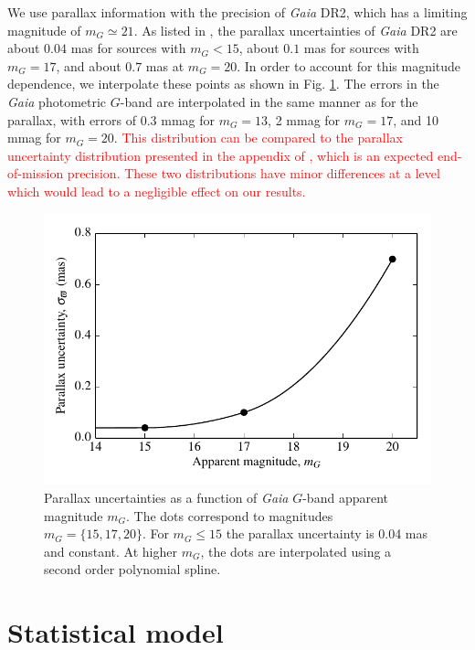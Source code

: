 \documentclass[fleqn,usenatbib]{mnras}
\newcommand{\changes}[1]{\textcolor{red}{#1}}
\begin{document}
We use parallax information with the precision of \emph{Gaia} DR2, which has a limiting magnitude of $m_G \simeq 21$. As listed in \cite{2018arXiv180409366L}, the parallax uncertainties of \emph{Gaia} DR2 are about $0.04$ mas for sources with $m_G<15$, about $0.1$ mas for sources with $m_G=17$, and about $0.7$ mas at $m_G=20$. In order to account for this magnitude dependence, we interpolate these points as shown in Fig. \ref{fig:parallax_error}. The errors in the \emph{Gaia} photometric $G$-band are interpolated in the same manner as for the parallax, with errors of 0.3 mmag for $m_G = 13$, 2 mmag for $m_G = 17$, and 10 mmag for $m_G = 20$. \changes{This distribution can be compared to the parallax uncertainty distribution presented in the appendix of \cite{2018A&A...616A...9L}, which is an expected end-of-mission precision. These two distributions have minor differences at a level which would lead to a negligible effect on our results.}

\begin{figure}
	\includegraphics[width=\columnwidth]{parallax_error.pdf}
    \caption{Parallax uncertainties as a function of \emph{Gaia} $G$-band apparent magnitude $m_G$. The dots correspond to magnitudes $m_G=\{15,17,20\}$. For $m_G\leq 15$ the parallax uncertainty is 0.04 mas and constant. At higher $m_G$, the dots are interpolated using a second order polynomial spline.}
    \label{fig:parallax_error}
\end{figure}





\section{Statistical model}\label{sec:method}
\end{document}
